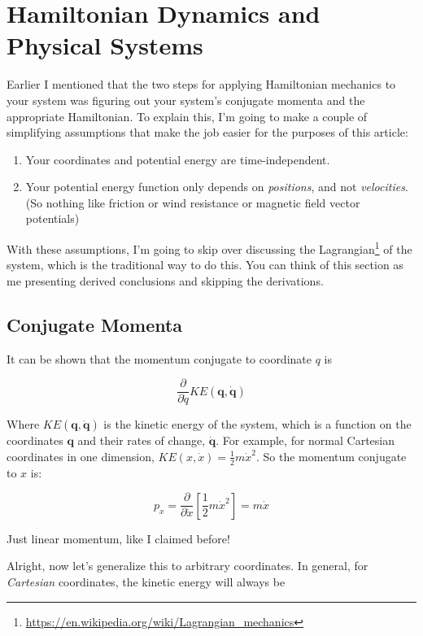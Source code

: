 \documentclass[]{article}
\renewcommand{\href}[2]{#2\footnote{\url{#1}}}
\begin{document}
\section{Hamiltonian Dynamics and Physical
Systems}\label{hamiltonian-dynamics-and-physical-systems}

Earlier I mentioned that the two steps for applying Hamiltonian mechanics to
your system was figuring out your system's conjugate momenta and the appropriate
Hamiltonian. To explain this, I'm going to make a couple of simplifying
assumptions that make the job easier for the purposes of this article:

\begin{enumerate}
\def\labelenumi{\arabic{enumi}.}
\tightlist
\item
  Your coordinates and potential energy are time-independent.
\item
  Your potential energy function only depends on \emph{positions}, and not
  \emph{velocities}. (So nothing like friction or wind resistance or magnetic
  field vector potentials)
\end{enumerate}

With these assumptions, I'm going to skip over discussing the
\href{https://en.wikipedia.org/wiki/Lagrangian_mechanics}{Lagrangian} of the
system, which is the traditional way to do this. You can think of this section
as me presenting derived conclusions and skipping the derivations.

\subsection{Conjugate Momenta}\label{conjugate-momenta}

It can be shown that the momentum conjugate to coordinate \(q\) is

\[
\frac{\partial}{\partial \dot{q}} KE(\mathbf{q}, \dot{\mathbf{q}})
\]

Where \(KE(\mathbf{q},\dot{\mathbf{q}})\) is the kinetic energy of the system,
which is a function on the coordinates \(\mathbf{q}\) and their rates of change,
\(\dot{\mathbf{q}}\). For example, for normal Cartesian coordinates in one
dimension, \(KE(x, \dot{x}) = \frac{1}{2} m \dot{x}^2\). So the momentum
conjugate to \(x\) is:

\[
p_x = \frac{\partial}{\partial \dot{x}} \left[ \frac{1}{2} m \dot{x}^2 \right] = m \dot{x}
\]

Just linear momentum, like I claimed before!

Alright, now let's generalize this to arbitrary coordinates. In general, for
\emph{Cartesian} coordinates, the kinetic energy will always be
\end{document}

